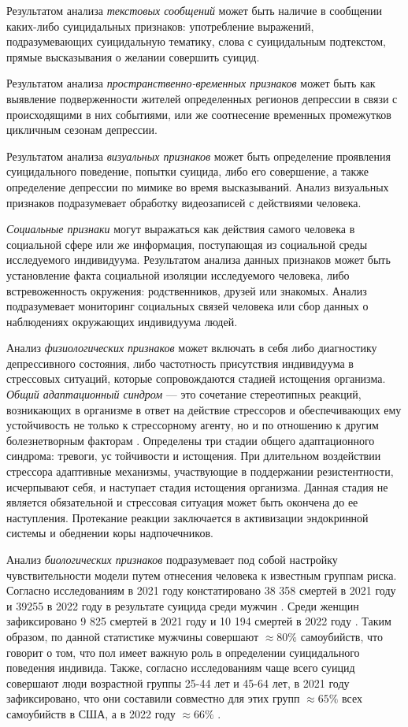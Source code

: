 Результатом анализа  \textit{текстовых сообщений} может быть наличие в сообщении каких-либо суицидальных признаков: употребление выражений, подразумевающих суицидальную тематику, слова с суицидальным подтекстом, прямые высказывания о желании совершить суицид.

Результатом анализа \textit{пространственно-временных признаков} может быть как выявление подверженности жителей определенных регионов депрессии в связи с происходящими в них событиями, или же соотнесение временных промежутков цикличным сезонам депрессии.

Результатом анализа \textit{визуальных признаков} может быть определение проявления суицидального поведение, попытки суицида, либо его совершение, а также определение депрессии по мимике во время высказываний. Анализ визуальных признаков подразумевает обработку видеозаписей с действиями человека.

\textit{Социальные признаки} могут выражаться как действия самого человека в социальной сфере или же информация, поступающая из социальной среды исследуемого индивидуума. Результатом анализа данных признаков может быть установление факта социальной изоляции исследуемого человека, либо встревоженность окружения: родственников, друзей или знакомых. Анализ подразумевает мониторинг социальных связей человека или сбор данных о наблюдениях окружающих индивидуума людей.

Анализ \textit{физиологических признаков} может включать в себя либо диагностику депрессивного состояния, либо частотность присутствия индивидуума в стрессовых ситуаций, которые сопровождаются стадией истощения организма. \textit{Общий адаптационный синдром} --- это сочетание стереотипных реакций, возникающих в организме в ответ на действие стрессоров и обеспечивающих ему устойчивость не только к стрессорному агенту, но и по отношению к другим болезнетворным факторам \cite{stressAndPatology}. Определены три стадии общего адаптационного синдрома: тревоги, ус\- тойчивости и истощения. При длительном воздействии стрессора адаптивные механизмы, участвующие в поддержании резистентности, исчерпывают себя, и наступает стадия истощения организма. Данная стадия не является обязательной и стрессовая ситуация может быть окончена до ее наступления. Протекание реакции заключается в активизации эндокринной системы и обеднении коры надпочечников. \cite{stressAndPatology}

Анализ \textit{биологических признаков} подразумевает под собой настройку чувствительности модели путем отнесения человека к известным группам риска. Согласно исследованиям в 2021 году констатировано 38 358 смертей в 2021 году и 39255 в 2022 году в результате суицида среди мужчин \cite{suicideStats}. Среди женщин зафиксировано 9 825 смертей в 2021 году и 10 194 смертей в 2022 году \cite{suicideStats}. Таким образом, по данной статистике мужчины совершают $\approx 80\%$ самоубийств, что говорит о том, что пол имеет важную роль в определении суицидального поведения индивида. Также, согласно исследованиям чаще всего суицид совершают люди возрастной группы 25-44 лет и 45-64 лет, в 2021 году зафиксировано, что они составили совместно для этих групп $\approx 65 \%$ всех самоубийств в США, а в 2022 году $\approx 66\%$ \cite{suicideStats}.


